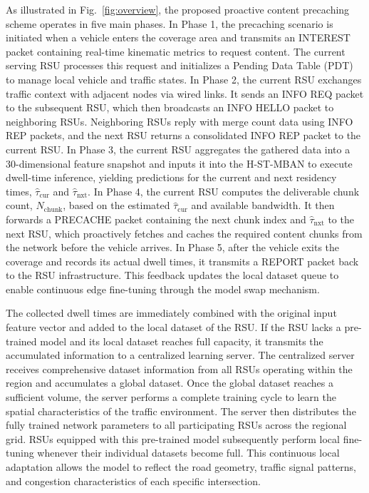 \documentclass[journal]{IEEEtran}
\begin{document}
As illustrated in Fig.~\ref{fig:overview}, the proposed proactive content precaching scheme operates in five main phases.
In Phase 1, the precaching scenario is initiated when a vehicle enters the coverage area and transmits an INTEREST packet containing real-time kinematic metrics to request content.
The current serving RSU processes this request and initializes a Pending Data Table (PDT) to manage local vehicle and traffic states.
In Phase 2, the current RSU exchanges traffic context with adjacent nodes via wired links.
It sends an INFO REQ packet to the subsequent RSU, which then broadcasts an INFO HELLO packet to neighboring RSUs.
Neighboring RSUs reply with merge count data using INFO REP packets, and the next RSU returns a consolidated INFO REP packet to the current RSU.
In Phase 3, the current RSU aggregates the gathered data into a 30-dimensional feature snapshot and inputs it into the H-ST-MBAN to execute dwell-time inference, yielding predictions for the current and next residency times, $\hat{\tau}_{\text{cur}}$ and $\hat{\tau}_{\text{nxt}}$.
In Phase 4, the current RSU computes the deliverable chunk count, $N_{\text{chunk}}$, based on the estimated $\hat{\tau}_{\text{cur}}$ and available bandwidth.
It then forwards a PRECACHE packet containing the next chunk index and $\hat{\tau}_{\text{nxt}}$ to the next RSU, which proactively fetches and caches the required content chunks from the network before the vehicle arrives.
In Phase 5, after the vehicle exits the coverage and records its actual dwell times, it transmits a REPORT packet back to the RSU infrastructure.
This feedback updates the local dataset queue to enable continuous edge fine-tuning through the model swap mechanism.

The collected dwell times are immediately combined with the original input feature vector and added to the local dataset of the RSU. If the RSU lacks a pre-trained model and its local dataset reaches full capacity, it transmits the accumulated information to a centralized learning server. The centralized server receives comprehensive dataset information from all RSUs operating within the region and accumulates a global dataset. Once the global dataset reaches a sufficient volume, the server performs a complete training cycle to learn the spatial characteristics of the traffic environment. The server then distributes the fully trained network parameters to all participating RSUs across the regional grid. RSUs equipped with this pre-trained model subsequently perform local fine-tuning whenever their individual datasets become full. This continuous local adaptation allows the model to reflect the road geometry, traffic signal patterns, and congestion characteristics of each specific intersection.
\end{document}
